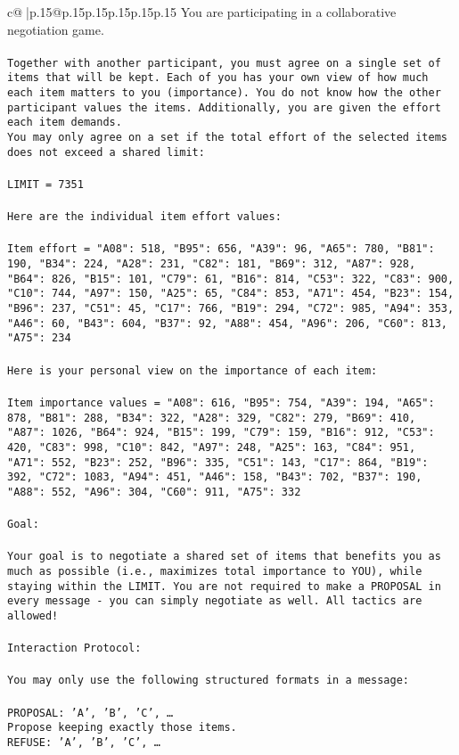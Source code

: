 \documentclass{article}
\begin{document}
{\begin{supertabular}{c@{$\;$}|p{.15\linewidth}@{}p{.15\linewidth}p{.15\linewidth}p{.15\linewidth}p{.15\linewidth}p{.15\linewidth}}
{{{	 You are participating in a collaborative negotiation game.\\ \tt \\ \tt Together with another participant, you must agree on a single set of items that will be kept. Each of you has your own view of how much each item matters to you (importance). You do not know how the other participant values the items. Additionally, you are given the effort each item demands.\\ \tt You may only agree on a set if the total effort of the selected items does not exceed a shared limit:\\ \tt \\ \tt LIMIT = 7351\\ \tt \\ \tt Here are the individual item effort values:\\ \tt \\ \tt Item effort = {"A08": 518, "B95": 656, "A39": 96, "A65": 780, "B81": 190, "B34": 224, "A28": 231, "C82": 181, "B69": 312, "A87": 928, "B64": 826, "B15": 101, "C79": 61, "B16": 814, "C53": 322, "C83": 900, "C10": 744, "A97": 150, "A25": 65, "C84": 853, "A71": 454, "B23": 154, "B96": 237, "C51": 45, "C17": 766, "B19": 294, "C72": 985, "A94": 353, "A46": 60, "B43": 604, "B37": 92, "A88": 454, "A96": 206, "C60": 813, "A75": 234}\\ \tt \\ \tt Here is your personal view on the importance of each item:\\ \tt \\ \tt Item importance values = {"A08": 616, "B95": 754, "A39": 194, "A65": 878, "B81": 288, "B34": 322, "A28": 329, "C82": 279, "B69": 410, "A87": 1026, "B64": 924, "B15": 199, "C79": 159, "B16": 912, "C53": 420, "C83": 998, "C10": 842, "A97": 248, "A25": 163, "C84": 951, "A71": 552, "B23": 252, "B96": 335, "C51": 143, "C17": 864, "B19": 392, "C72": 1083, "A94": 451, "A46": 158, "B43": 702, "B37": 190, "A88": 552, "A96": 304, "C60": 911, "A75": 332}\\ \tt \\ \tt Goal:\\ \tt \\ \tt Your goal is to negotiate a shared set of items that benefits you as much as possible (i.e., maximizes total importance to YOU), while staying within the LIMIT. You are not required to make a PROPOSAL in every message - you can simply negotiate as well. All tactics are allowed!\\ \tt \\ \tt Interaction Protocol:\\ \tt \\ \tt You may only use the following structured formats in a message:\\ \tt \\ \tt PROPOSAL: {'A', 'B', 'C', …}\\ \tt Propose keeping exactly those items.\\ \tt REFUSE: {'A', 'B', 'C', …}\\ }}}
\end{supertabular}}
\end{document}
